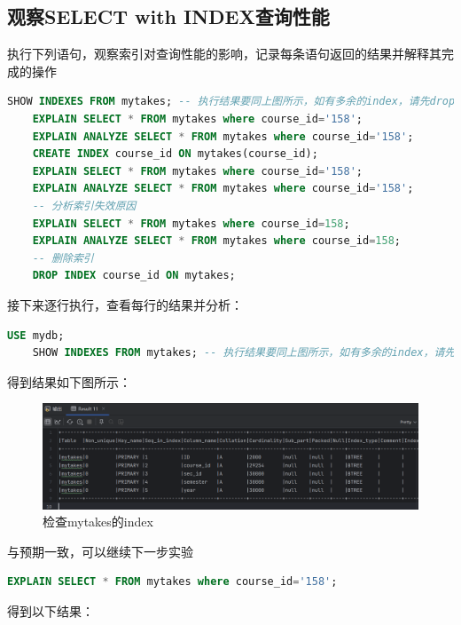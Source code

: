 \documentclass{article}
\begin{document}
	\subsection{观察SELECT with INDEX查询性能}
	
	执行下列语句，观察索引对查询性能的影响，记录每条语句返回的结果并解释其完成的操作
	
	\begin{lstlisting}[language=sql, title=索引对查询性能的影响 - 总, tabsize=4]
	SHOW INDEXES FROM mytakes; -- 执行结果要同上图所示，如有多余的index，请先drop删除掉
	EXPLAIN SELECT * FROM mytakes where course_id='158';
	EXPLAIN ANALYZE SELECT * FROM mytakes where course_id='158';
	CREATE INDEX course_id ON mytakes(course_id);
	EXPLAIN SELECT * FROM mytakes where course_id='158';
	EXPLAIN ANALYZE SELECT * FROM mytakes where course_id='158';
	-- 分析索引失效原因
	EXPLAIN SELECT * FROM mytakes where course_id=158;
	EXPLAIN ANALYZE SELECT * FROM mytakes where course_id=158;
	-- 删除索引
	DROP INDEX course_id ON mytakes;
	\end{lstlisting}
	
	接下来逐行执行，查看每行的结果并分析：
	
	\begin{lstlisting}[language=sql, title=索引对查询性能的影响, tabsize=4]
	USE mydb;
	SHOW INDEXES FROM mytakes; -- 执行结果要同上图所示，如有多余的index，请先drop删除掉
	\end{lstlisting}
	
	得到结果如下图所示：
	
	\begin{figure}[H]
		\centering
		\includegraphics[width=13cm]{./images/3.检查mytakes的index.png}
		\caption{检查mytakes的index}
	\end{figure}
	
	与预期一致，可以继续下一步实验

	\begin{lstlisting}[language=sql, title=索引对查询性能的影响, tabsize=4]
	EXPLAIN SELECT * FROM mytakes where course_id='158';
	\end{lstlisting}
	
	得到以下结果：
	
\end{document}
